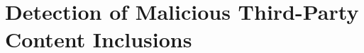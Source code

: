 \newcommand{\excision}{\textsc{Excision}\xspace}

\section{Detection of Malicious Third-Party Content Inclusions}









